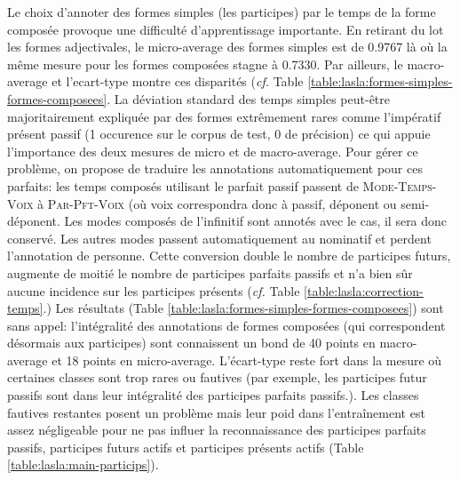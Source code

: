 Le choix d'annoter des formes simples (les participes) par le temps de la forme composée provoque une difficulté d'apprentissage importante. En retirant du lot les formes adjectivales, le \gls{micro-average} des formes simples est de 0.9767 là où la même mesure pour les formes composées stagne à 0.7330. Par ailleurs, le \gls{macro-average} et l'\gls{ecart-type} montre ces disparités (\textit{cf.} Table \ref{table:lasla:formes-simples-formes-composees}. La déviation standard des temps simples peut-être majoritairement expliquée par des formes extrêmement rares comme l'impératif présent passif (1 occurence sur le corpus de test, 0 de précision) ce qui appuie l'importance des deux mesures de micro et de macro-average. Pour gérer ce problème, on propose de traduire les annotations automatiquement pour ces parfaits: les temps composés utilisant le parfait passif passent de \textsc{Mode-Temps-Voix} à \textsc{Par-Pft-Voix} (où voix correspondra donc à passif, déponent ou semi-déponent. Les modes composés de l'infinitif sont annotés avec le cas, il sera donc conservé. Les autres modes passent automatiquement au nominatif et perdent l'annotation de personne. Cette conversion double le nombre de participes futurs, augmente de moitié le nombre de participes parfaits passifs et n'a bien sûr aucune incidence sur les participes présents (\textit{cf.} Table \ref{table:lasla:correction-temps}.) Les résultats (Table \ref{table:lasla:formes-simples-formes-composees}) sont sans appel: l'intégralité des annotations de formes composées (qui correspondent désormais aux participes) sont connaissent un bond de 40 points en macro-average et 18 points en micro-average. L'écart-type reste fort dans la mesure où certaines classes sont trop rares ou fautives (par exemple, les participes futur passifs sont dans leur intégralité des participes parfaits passifs.). Les classes fautives restantes posent un problème mais leur poid dans l'entraînement est assez négligeable pour ne pas influer la reconnaissance des participes parfaits passifs, participes futurs actifs et participes présents actifs (Table \ref{table:lasla:main-particips}).


